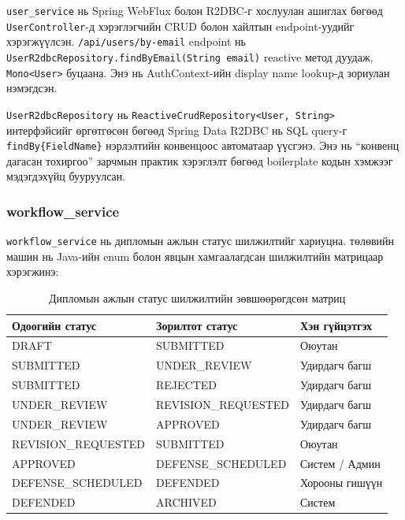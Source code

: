 \texttt{user\_service} нь Spring WebFlux болон R2DBC-г хослуулан ашиглах
бөгөөд \texttt{UserController}-д хэрэглэгчийн CRUD болон хайлтын
endpoint-уудийг хэрэгжүүлсэн. \texttt{/api/users/by-email} endpoint нь
\texttt{UserR2dbcRepository.findByEmail(String email)} reactive метод
дуудаж, \texttt{Mono<User>} буцаана. Энэ нь AuthContext-ийн
display name lookup-д зориулан нэмэгдсэн.

\texttt{UserR2dbcRepository} нь \texttt{ReactiveCrudRepository<User, String>}
интерфэйсийг өргөтгөсөн бөгөөд Spring Data R2DBC нь SQL query-г
\texttt{findBy\{FieldName\}} нэрлэлтийн конвенцоос автоматаар үүсгэнэ.
Энэ нь ``конвенц дагасан тохиргоо''
зарчмын практик хэрэглэлт бөгөөд boilerplate кодын хэмжээг мэдэгдэхүйц
бууруулсан.

\subsubsection{workflow\_service}

\texttt{workflow\_service} нь дипломын ажлын статус шилжилтийг хариуцна.
төлөвийн машин нь Java-ийн enum болон явцын хамгаалагдсан шилжилтийн
матрицаар хэрэгжинэ:

\begin{table}[H]
    \centering
    \caption{Дипломын ажлын статус шилжилтийн зөвшөөрөгдсөн матриц}
    \label{tab:workflow_transitions}
    \renewcommand{\arraystretch}{0.7}
    \begin{tabular}{lll}
        \toprule
        \textbf{Одоогийн статус} & \textbf{Зорилтот статус} & \textbf{Хэн гүйцэтгэх} \\
        \midrule
        DRAFT              & SUBMITTED           & Оюутан \\
        SUBMITTED          & UNDER\_REVIEW       & Удирдагч багш \\
        SUBMITTED          & REJECTED            & Удирдагч багш \\
        UNDER\_REVIEW      & REVISION\_REQUESTED & Удирдагч багш \\
        UNDER\_REVIEW      & APPROVED            & Удирдагч багш \\
        REVISION\_REQUESTED & SUBMITTED          & Оюутан \\
        APPROVED           & DEFENSE\_SCHEDULED  & Систем / Админ \\
        DEFENSE\_SCHEDULED & DEFENDED            & Хорооны гишүүн \\
        DEFENDED           & ARCHIVED            & Систем \\
        \bottomrule
    \end{tabular}
\end{table}

